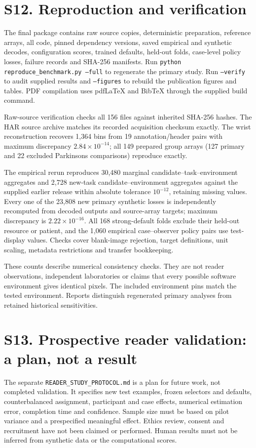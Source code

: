 \documentclass[10pt]{article}
\begin{document}
\section*{S12. Reproduction and verification}
The final package contains raw source copies, deterministic preparation, reference arrays, all code, pinned dependency versions, saved empirical and synthetic decodes, configuration scores, trained defaults, held-out folds, case-level policy losses, failure records and SHA-256 manifests. Run \texttt{python reproduce\_benchmark.py --full} to regenerate the primary study. Run \texttt{--verify} to audit supplied results and \texttt{--figures} to rebuild the publication figures and tables. PDF compilation uses pdfLaTeX and BibTeX through the supplied build command.

Raw-source verification checks all 156 files against inherited SHA-256 hashes. The HAR source archive matches its recorded acquisition checksum exactly. The wrist reconstruction recovers 1,364 bins from 19 annotation/header pairs with maximum discrepancy $2.84\times10^{-14}$; all 149 prepared group arrays (127 primary and 22 excluded Parkinsons comparisons) reproduce exactly.

The empirical rerun reproduces 30,480 marginal candidate--task--environment aggregates and 2,728 new-task candidate--environment aggregates against the supplied earlier release within absolute tolerance $10^{-12}$, retaining missing values. Every one of the 23,808 new primary synthetic losses is independently recomputed from decoded outputs and source-array targets; maximum discrepancy is $2.22\times10^{-16}$. All 168 strong-default folds exclude their held-out resource or patient, and the 1,060 empirical case--observer policy pairs use test-display values. Checks cover blank-image rejection, target definitions, unit scaling, metadata restrictions and transfer bookkeeping.

These counts describe numerical consistency checks. They are not reader observations, independent laboratories or claims that every possible software environment gives identical pixels. The included environment pins match the tested environment. Reports distinguish regenerated primary analyses from retained historical sensitivities.

\section*{S13. Prospective reader validation: a plan, not a result}
The separate \texttt{READER\_STUDY\_PROTOCOL.md} is a plan for future work, not completed validation. It specifies new test examples, frozen selectors and defaults, counterbalanced assignment, participant and case effects, numerical estimation error, completion time and confidence. Sample size must be based on pilot variance and a prespecified meaningful effect. Ethics review, consent and recruitment have not been claimed or performed. Human results must not be inferred from synthetic data or the computational scores.

\begingroup\small\endgroup
\end{document}
